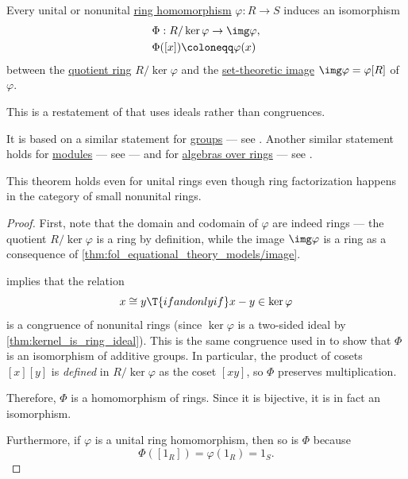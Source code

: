 \begin{theorem}\label{thm:homomorphism_theorem_for_rings}
  Every unital or nonunital \hyperref[def:ring/morphism]{ring homomorphism} \( {\varphi: R \to S} \) induces an isomorphism
  \begin{equation*}
    \begin{aligned}
      &\Phi: R / \ker \varphi \to \img \varphi, \\
      &\Phi([x]) \coloneqq \varphi(x)
    \end{aligned}
  \end{equation*}
  between the \hyperref[def:ring/quotient]{quotient ring} \( R / \ker \varphi \) and the \hyperref[def:set_valued_function/image]{set-theoretic image} \( \img \varphi = \varphi[R] \) of \( \varphi \).
\end{theorem}
\begin{comments}
  \item This is a restatement of  that uses ideals rather than congruences.

  It is based on a similar statement for \hyperref[def:group]{groups} --- see . Another similar statement holds for \hyperref[def:module]{modules} --- see  --- and for \hyperref[def:algebra_over_ring]{algebras over rings} --- see .

  \item This theorem holds even for unital rings even though ring factorization happens in the category of small nonunital rings.
\end{comments}
\begin{proof}
  First, note that the domain and codomain of \( \varphi \) are indeed rings --- the quotient \( R / \ker \varphi \) is a ring by definition, while the image \( \img \varphi \) is a ring as a consequence of \cref{thm:fol_equational_theory_models/image}.

   implies that the relation
  \begin{equation*}
    x \cong y \T{if and only if} x - y \in \ker \varphi
  \end{equation*}
  is a congruence of nonunital rings (since \( \ker \varphi \) is a two-sided ideal by \cref{thm:kernel_is_ring_ideal}). This is the same congruence used in  to show that \( \Phi \) is an isomorphism of additive groups. In particular, the product of cosets \( [x][y] \) is \emph{defined} in \( R / \ker \varphi \) as the coset \( [xy] \), so \( \Phi \) preserves multiplication.

  Therefore, \( \Phi \) is a homomorphism of rings. Since it is bijective, it is in fact an isomorphism.

  Furthermore, if \( \varphi \) is a unital ring homomorphism, then so is \( \Phi \) because
  \begin{equation*}
    \Phi([1_R]) = \varphi(1_R) = 1_S.
  \end{equation*}
\end{proof}

